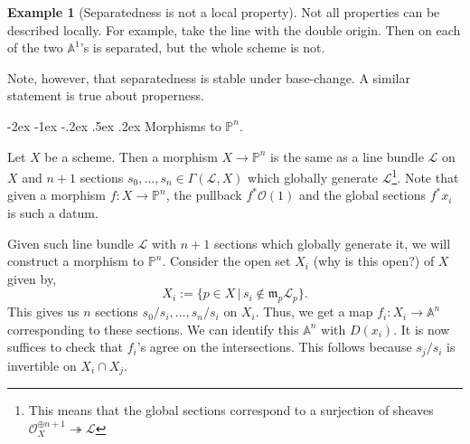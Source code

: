 \documentclass[11pt]{amsart}
\makeatletter
\renewcommand\subsection{\@startsection {subsection}{1}{\z@}%
	{-2ex \@plus -1ex \@minus -.2ex}%
	{.5ex \@plus.2ex}%
	{\normalfont\bfseries}}
\newcommand{\Spec}{{\rm Spec \,}}
\newcommand{\sL}{{\mathcal L}}
\newcommand{\sO}{{\mathcal O}}
\newcommand{\A}{{\mathbb A}}
\renewcommand{\P}{{\mathbb P}}
\theoremstyle{definition}
\newtheorem{example}[theorem]{Example}
\makeatother
\begin{document}
\begin{comment}
\begin{enumerate}
	\item $x\mapsto x^2$ (more, generally $x^n$). This morphism is ramified at the origin (but unramified on $\A^1\setminus \lbrace 0\rbrace$), finitely presented, flat.
	\item A non-quasi-compact open immersion. $\Spec k[x_1,x_2,\ldots]\setminus\lbrace (x_1,x_2,\ldots)\rbrace\hookrightarrow \Spec k[x_1,x_2,\ldots]$ Polynomial ring in infinitely many variables and knock off the origin.
	\item A finite morphism. 
	\item A smooth morphism. A non-smooth morphism (nodal curve over $\A^1$).
	\item Open embeddings are locally of finite presentation\footnote{This is not true in perfectoid geometry, which is quite sad.}.
	\item Open embedding is \'{e}tale is fppf is fpqc.
\end{enumerate}
\end{comment}


\begin{example}[Separatedness is not a local property]
	 \label{example-not-local-property}
	 Not all properties can be described locally. For example, take the line with the double origin. Then on each of the two $\A^1$'s is separated, but the whole scheme is not. 
	
Note, however, that separatedness is stable under base-change. A similar statement is true about properness.
	
\end{example}


\subsection{Morphisms to \texorpdfstring{$\P^n$}{Pn}.}
\label{subsection-functor-of-Pn} 

Let $X$ be a scheme. Then a morphism $X\rightarrow\P^n$ is the same as a line bundle $\sL$ on $X$ and $n+1$ sections $s_0,\ldots,s_n \in \Gamma (\sL,X)$ which globally generate $\sL$\footnote{This means that the global sections correspond to a surjection of sheaves $\sO_X^{\oplus n+1}\twoheadrightarrow \sL$}. Note that given a morphism $f: X\rightarrow \P^n$, the pullback $f^* \sO(1)$ and the global sections $f^*x_i$ is such a datum.

Given such line bundle $\sL$ with $n+1$ sections which globally generate it, we will construct a morphism to $\P^n$. Consider the open set $X_i$ (why is this open?) of $X$ given by,
\[X_i:=\lbrace p\in X \, |\, s_i\notin \mathfrak{m}_p\sL_p\rbrace.\]
This gives us $n$ sections $s_0/s_i,\ldots,s_n/s_i$ on $X_i$. Thus, we get a map $f_i:X_i\rightarrow \A^n$ corresponding to these sections. We can identify this $\A^n$ with $D(x_i)$. It is now suffices to check that $f_i$'s agree on the intersections. This follows because $s_j/s_i$ is invertible on $X_i\cap X_j$.
\end{document}
